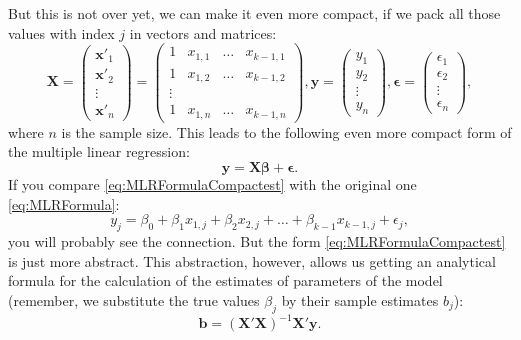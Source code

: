 \documentclass[
]{book}
\theoremstyle{definition}
\theoremstyle{definition}
\theoremstyle{definition}
\theoremstyle{definition}
\theoremstyle{remark}
\begin{document}
But this is not over yet, we can make it even more compact, if we pack all those values with index \(j\) in vectors and matrices:
\begin{equation}
    \mathbf{X} = \begin{pmatrix} \mathbf{x}'_1 \\ \mathbf{x}'_2 \\ \vdots \\ \mathbf{x}'_n \end{pmatrix} = 
    \begin{pmatrix} 1 & x_{1,1} & \dots & x_{k-1,1} \\ 1 & x_{1,2} & \dots & x_{k-1,2} \\ \vdots \\ 1 & x_{1,n} & \dots & x_{k-1,n} \end{pmatrix}, 
    \mathbf{y} = \begin{pmatrix} y_1 \\ y_2 \\ \vdots \\ y_n \end{pmatrix}, 
    \boldsymbol{\epsilon} = \begin{pmatrix} \epsilon_1 \\ \epsilon_2 \\ \vdots \\ \epsilon_n \end{pmatrix} ,
    \label{eq:MLRMatrices}
\end{equation}
where \(n\) is the sample size. This leads to the following even more compact form of the multiple linear regression:
\begin{equation}
    \mathbf{y} = \mathbf{X} \boldsymbol{\beta} + \boldsymbol{\epsilon} .
    \label{eq:MLRFormulaCompactest}
\end{equation}
If you compare \eqref{eq:MLRFormulaCompactest} with the original one \eqref{eq:MLRFormula}:
\begin{equation*}
    y_j = \beta_0 + \beta_1 x_{1,j} + \beta_2 x_{2,j} + \dots + \beta_{k-1} x_{k-1,j} + \epsilon_j ,
\end{equation*}
you will probably see the connection. But the form \eqref{eq:MLRFormulaCompactest} is just more abstract. This abstraction, however, allows us getting an analytical formula for the calculation of the estimates of parameters of the model (remember, we substitute the true values \(\beta_j\) by their sample estimates \(b_j\)):
\begin{equation}
    \mathbf{b} = \left(\mathbf{X}' \mathbf{X}\right)^{-1} \mathbf{X}' \mathbf{y} .
    \label{eq:MLROLS}
\end{equation}
\end{document}
